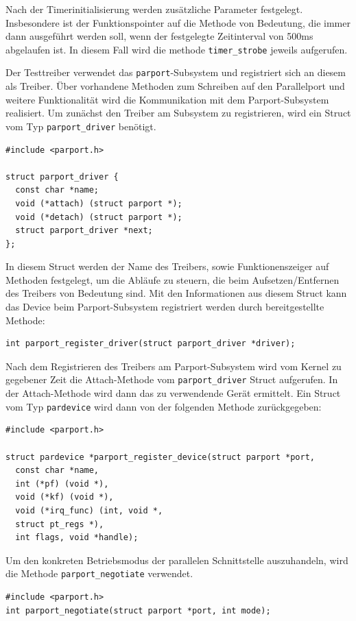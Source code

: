 \documentclass[a4paper,11pt]{article}
\begin{document}
Nach der Timerinitialisierung werden zusätzliche Parameter festgelegt. Insbesondere ist der Funktionspointer auf die Methode von Bedeutung, die immer dann ausgeführt werden soll, wenn der festgelegte Zeitinterval von 500ms abgelaufen ist. In diesem Fall wird die methode \verb|timer_strobe| jeweils aufgerufen.

Der Testtreiber verwendet das \verb|parport|-Subsystem und registriert sich an diesem als Treiber. Über vorhandene Methoden zum Schreiben auf den Parallelport und weitere Funktionalität wird die Kommunikation mit dem Parport-Subsystem realisiert. Um zunächst den Treiber am Subsystem zu registrieren, wird ein Struct vom Typ \verb|parport_driver| benötigt.

\begin{verbatim}
#include <parport.h>

struct parport_driver {
  const char *name;
  void (*attach) (struct parport *);
  void (*detach) (struct parport *);
  struct parport_driver *next;
};
\end{verbatim}

In diesem Struct werden der Name des Treibers, sowie Funktionenszeiger auf Methoden festgelegt, um die Abläufe zu steuern, die beim Aufsetzen/Entfernen des Treibers von Bedeutung sind. Mit den Informationen aus diesem Struct kann das Device beim Parport-Subsystem registriert werden durch bereitgestellte Methode:
\begin{verbatim}
int parport_register_driver(struct parport_driver *driver);
\end{verbatim}


Nach dem Registrieren des Treibers am Parport-Subsystem wird vom Kernel zu gegebener Zeit die Attach-Methode vom \verb|parport_driver| Struct aufgerufen. In der Attach-Methode wird dann das zu verwendende Gerät ermittelt. Ein Struct vom Typ \verb|pardevice| wird dann von der folgenden Methode zurückgegeben:

\begin{verbatim}
#include <parport.h>

struct pardevice *parport_register_device(struct parport *port, 
  const char *name, 
  int (*pf) (void *), 
  void (*kf) (void *), 
  void (*irq_func) (int, void *, 
  struct pt_regs *), 
  int flags, void *handle);
\end{verbatim}

Um den konkreten Betriebsmodus der parallelen Schnittstelle auszuhandeln, wird die Methode \verb|parport_negotiate| verwendet.

\begin{verbatim}
#include <parport.h>
int parport_negotiate(struct parport *port, int mode);
\end{verbatim}
\end{document}
